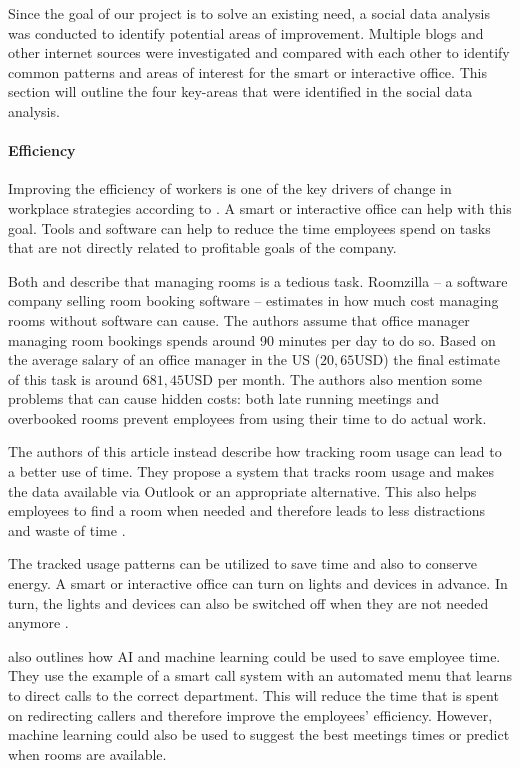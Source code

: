 Since the goal of our project is to solve an existing need, a social data analysis was conducted to 
identify potential areas of improvement. Multiple blogs and other internet sources were investigated 
and compared with each other to identify common patterns and areas of interest for the smart or 
interactive office. This section will outline the four key-areas that were identified in the social 
data analysis.

\paragraph{Efficiency}\label{sec:sda-efficiency}
Improving the efficiency of workers is one of the key drivers of change in workplace strategies 
according to \cite{hub13}. A smart or interactive office can help with this goal. Tools and software 
can help to reduce the time employees spend on tasks that are not directly related to profitable 
goals of the company.

Both \cite{iotagenda} and \cite{roomzilla9} describe that managing rooms is a tedious task. 
Roomzilla -- a software company selling room booking software -- estimates in \cite{roomzilla9} how 
much cost managing rooms without software can cause. The authors assume that office manager managing 
room bookings spends around 90 minutes per day to do so. Based on the average salary of an office 
manager in the US (\(20,65\text{USD}\)) the final estimate of this task is around \(681,45\text{USD}\) 
per month. The authors also mention some problems that can cause hidden costs: both late running 
meetings and overbooked rooms prevent employees from using their time to do actual work. 

The authors of this article instead describe how tracking room usage can lead to a better use of 
time. They propose a system that tracks room usage and makes the data available via Outlook or an 
appropriate alternative. This also helps employees to find a room when needed and therefore leads to 
less distractions and waste of time \cite{iotagenda}.

The tracked usage patterns can be utilized to save time and also to conserve energy. A smart or 
interactive office can turn on lights and devices in advance. In turn, the lights and devices can 
also be switched off when they are not needed anymore \cite{hbcommunications}.


\cite{hbcommunications} also outlines how AI and machine learning could be used to save employee 
time. They use the example of a smart call system with an automated menu that learns to direct calls 
to the correct department. This will reduce the time that is spent on redirecting callers and 
therefore improve the employees' efficiency. However, machine learning could also be used to suggest 
the best meetings times or predict when rooms are available.

